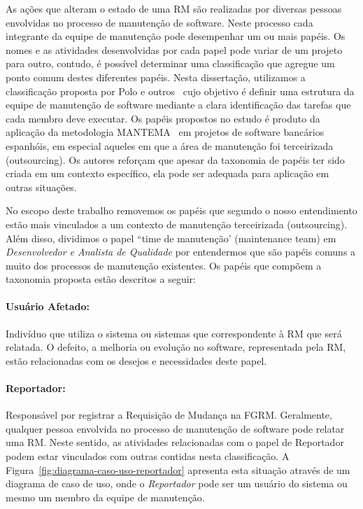 As ações que alteram o estado de uma RM são realizadas por diversas pessoas
envolvidas no processo de manutenção de software. Neste processo cada integrante
da equipe de manutenção pode desempenhar um ou mais papéis. Os nomes e as
atividades desenvolvidas por cada papel pode variar de um projeto para outro,
contudo, é possível determinar uma classificação que agregue um ponto comum
destes diferentes papéis. Nesta dissertação, utilizamos a classificação proposta
por Polo e outros~\cite{Polo1999} cujo objetivo é definir uma estrutura da
equipe de manutenção de software mediante a clara identificação das tarefas que
cada membro deve executar. Os papéis propostos no estudo é produto da aplicação
da metodologia MANTEMA~\cite{756695} em projetos de software bancários
espanhóis, em especial aqueles em que a área de manutenção foi terceirizada
(outsourcing). Os autores reforçam que apesar da taxonomia de papéis ter sido
criada em um contexto específico, ela pode ser adequada para aplicação em outras
situações.

No escopo deste trabalho removemos os papéis que segundo o nosso entendimento
estão mais vinculados a um contexto de manutenção terceirizada (outsourcing).
Além disso, dividimos o papel ``time de manutenção' (maintenance team) em
\textit{Desenvolvedor e Analista de Qualidade} por entendermos que são papéis
comuns a muito dos processos de manutenção existentes. Os papéis que compõem a
taxonomia proposta estão descritos a seguir:

\paragraph{Usuário Afetado:}
Indivíduo que utiliza o sistema ou sistemas que correspondente à RM que será
relatada. O defeito, a melhoria ou evolução no software, representada pela RM,
estão relacionadas com os desejos e necessidades deste papel.

\paragraph{Reportador:}
Responsável por registrar a Requisição de Mudança na FGRM\@. Geralmente,
qualquer pessoa envolvida no processo de manutenção de software pode relatar uma
RM\@. Neste sentido, as atividades relacionadas com o papel de Reportador podem
estar vinculados com outras contidas nesta classificação. A
Figura~\ref{fig:diagrama-caso-uso-reportador} apresenta esta situação através de
um diagrama de caso de uso, onde o \textit{Reportador} pode ser um usuário do
sistema ou mesmo um membro da equipe de manutenção.

